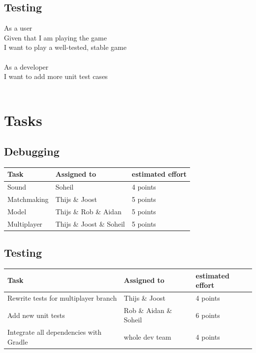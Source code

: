 \documentclass{article}
\begin{document}
\subsection*{Testing}
As a user\\
Given that I am playing the game\\
I want to play a well-tested, stable game\\\\
As a developer\\
I want to add more unit test cases\\\\
\section*{Tasks}
\subsection*{Debugging}
\begin{tabular}{ | l | l | l | }
\hline
\textbf{Task} & \textbf{Assigned to} & \textbf{estimated effort} \\ \hline
Sound & Soheil & 4 points \\ \hline
Matchmaking & Thijs \& Joost & 5 points \\\hline
Model & Thijs \& Rob \& Aidan  & 5 points \\ \hline
Multiplayer & Thijs \& Joost \& Soheil & 5 points \\ \hline
\end{tabular} \newline
\subsection*{Testing}
\begin{tabular}{ | l | l | l | }
\hline
\textbf{Task} & \textbf{Assigned to} & \textbf{estimated effort} \\ \hline
Rewrite tests for multiplayer branch & Thijs \& Joost & 4 points \\ \hline
Add new unit tests & Rob \& Aidan \& Soheil & 6 points \\\hline
Integrate all dependencies with Gradle & whole dev team & 4 points \\ \hline
\end{tabular} \newline
\newline \\
\end{document}
